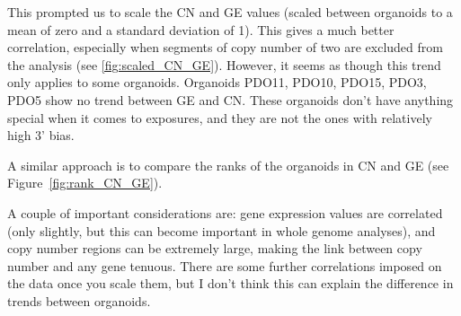 \documentclass{article}
\begin{document}
\medskip

This prompted us to scale the CN and GE values (scaled between organoids to a mean of zero and a standard deviation of 1). This gives a much better correlation, especially when segments of copy number of two are excluded from the analysis (see \ref{fig:scaled_CN_GE}). However, it seems as though this trend only applies to some organoids. Organoids PDO11, PDO10, PDO15, PDO3, PDO5 show no trend between GE and CN. These organoids don't have anything special when it comes to exposures, and they are not the ones with relatively high 3' bias.

\medskip

A similar approach is to compare the ranks of the organoids in CN and GE (see Figure~\ref{fig:rank_CN_GE}).

\medskip

A couple of important considerations are: gene expression values are correlated (only slightly, but this can become important in whole genome analyses), and copy number regions can be extremely large, making the link between copy number and any gene tenuous. There are some further correlations imposed on the data once you scale them, but I don't think this can explain the difference in trends between organoids.
\end{document}
